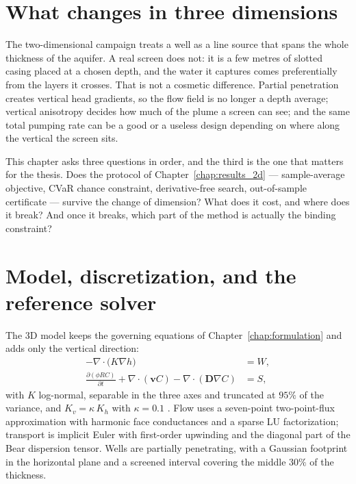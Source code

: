
\label{sec:results-3d}

\section{What changes in three dimensions}

The two-dimensional campaign treats a well as a line source that spans the whole
thickness of the aquifer. A real screen does not: it is a few metres of slotted
casing placed at a chosen depth, and the water it captures comes preferentially
from the layers it crosses. That is not a cosmetic difference. Partial
penetration creates vertical head gradients, so the flow field is no longer a
depth average; vertical anisotropy decides how much of the plume a screen can
see; and the same total pumping rate can be a good or a useless design depending
on where along the vertical the screen sits.

This chapter asks three questions in order, and the third is the one that
matters for the thesis. Does the protocol of Chapter~\ref{chap:results_2d} ---
sample-average objective, CVaR chance constraint, derivative-free search,
out-of-sample certificate --- survive the change of dimension? What does it cost,
and where does it break? And once it breaks, which part of the method is
actually the binding constraint?

\section{Model, discretization, and the reference solver}

The 3D model keeps the governing equations of Chapter~\ref{chap:formulation} and
adds only the vertical direction:
\begin{align}
  -\nabla\cdot\bigl(K\nabla h\bigr) &= W, \\
  \frac{\partial(\phi R C)}{\partial t} + \nabla\cdot(\mathbf{v}C)
  - \nabla\cdot(\mathbf{D}\nabla C) &= S,
\end{align}
with $K$ log-normal, separable in the three axes and truncated at $95\%$ of the
variance, and $K_v=\kappa\,K_h$ with $\kappa=0.1$
\citep{bear1972,li2020fourier}. Flow uses a seven-point two-point-flux
approximation with harmonic face conductances and a sparse LU factorization;
transport is implicit Euler with first-order upwinding and the diagonal part of
the Bear dispersion tensor. Wells are partially penetrating, with a Gaussian
footprint in the horizontal plane and a screened interval covering the middle
$30\%$ of the thickness.

